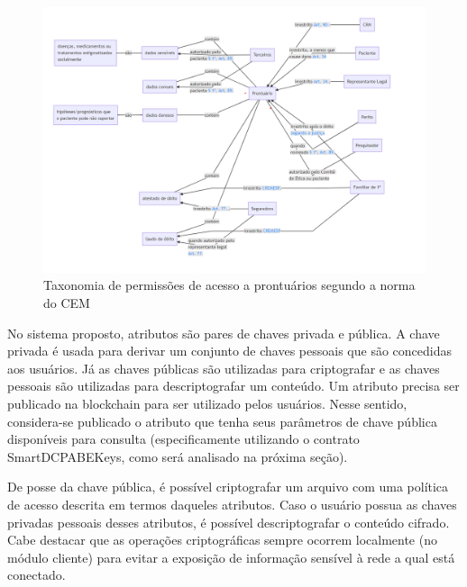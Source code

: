 \documentclass[a4paper,11pt]{article}
\begin{document}
\begin{figure}[h]
  \centering
  \includegraphics[width=\textwidth]{images/taxonomia-de-permissoes.png}
  \caption{Taxonomia de permissões de acesso a prontuários segundo a norma do CEM}
  \label{fig:taxonomiaPermissoes}
\end{figure}


No sistema proposto, atributos são pares de chaves privada e pública.
A chave privada é usada para derivar um conjunto de chaves pessoais que são concedidas aos usuários.
Já as chaves públicas são utilizadas para criptografar e as chaves pessoais são utilizadas para descriptografar um conteúdo.
Um atributo precisa ser publicado na blockchain para ser utilizado pelos usuários.
Nesse sentido, considera-se publicado o atributo que tenha seus parâmetros de chave pública disponíveis para consulta (especificamente utilizando o contrato SmartDCPABEKeys, como será analisado na próxima seção).

De posse da chave pública, é possível criptografar um arquivo com uma política de acesso descrita em termos daqueles atributos. Caso o usuário possua as chaves privadas pessoais desses atributos, é possível descriptografar o conteúdo cifrado.
Cabe destacar que as operações criptográficas sempre ocorrem localmente {\color{blue}(no módulo cliente)} para evitar a exposição de informação sensível à rede a qual está conectado.

\end{document}
